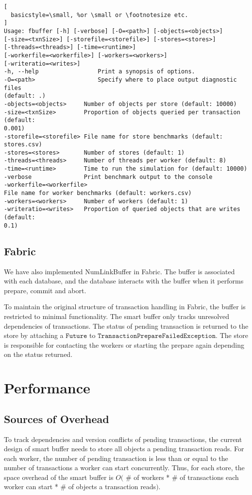 \documentclass{article}
\begin{document}
\begin{lstlisting}[
  basicstyle=\small, %or \small or \footnotesize etc.
]
Usage: fbuffer [-h] [-verbose] [-O=<path>] [-objects=<objects>]
[-size=<txnSize>] [-storefile=<storefile>] [-stores=<stores>]
[-threads=<threads>] [-time=<runtime>]
[-workerfile=<workerfile>] [-workers=<workers>]
[-writeratio=<writes>]
-h, --help                 Print a synopsis of options.
-O=<path>                  Specify where to place output diagnostic files
(default: .)
-objects=<objects>     Number of objects per store (default: 10000)
-size=<txnSize>        Proportion of objects queried per transaction (default:
0.001)
-storefile=<storefile> File name for store benchmarks (default: stores.csv)
-stores=<stores>       Number of stores (default: 1)
-threads=<threads>     Number of threads per worker (default: 8)
-time=<runtime>        Time to run the simulation for (default: 10000)
-verbose               Print benchmark output to the console
-workerfile=<workerfile>
File name for worker benchmarks (default: workers.csv)
-workers=<workers>     Number of workers (default: 1)
-writeratio=<writes>   Proportion of queried objects that are writes (default:
0.1)
\end{lstlisting}


\subsection{Fabric}
We have also implemented NumLinkBuffer in Fabric. The buffer is associated with
each database, and the database interacts with the buffer when it performs
prepare, commit and abort.

To maintain the original structure of transaction handling in Fabric, the buffer
is restricted to minimal functionality. The smart buffer only tracks unresolved
dependencies of transactions. The status of pending transaction is returned to
the store by attaching a $\mathtt{Future}$ to
$\mathtt{TransactionPrepareFailedException}$. The store is responsible for
contacting the workers or starting the prepare again depending on the status
returned.

\section{Performance}
\label{sec:performance}
\subsection{Sources of Overhead}
To track dependencies and version conflicts of pending transactions, the current
design of smart buffer needs to store all objects a pending transaction reads.
For each worker, the number of pending transaction is less than or equal to the
number of transactions a worker can start concurrently. Thus, for each store,
the space overhead of the smart buffer is $O($ \# of workers * \# of transactions
each worker can start * \# of objects a transaction reads$)$.
\end{document}
